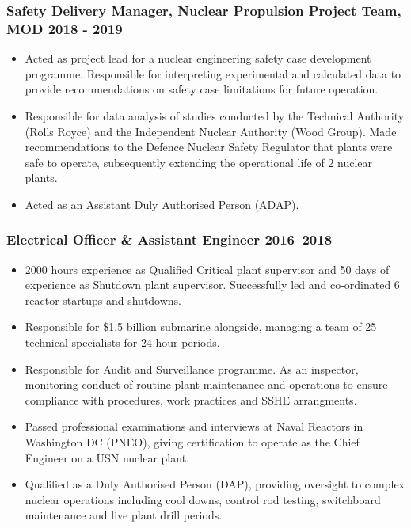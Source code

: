 \documentclass[a4paper, oneside, final, 11pt]{scrartcl} %
\begin{document}
\subsubsection*{Safety Delivery Manager,  Nuclear Propulsion Project Team, MOD \hfill 2018 - 2019}  
\normalfont
\begin{itemize}

\item Acted as project lead for a nuclear engineering safety case development programme.  Responsible for interpreting experimental and calculated data to provide recommendations on safety case limitations for future operation.

\item Responsible for data analysis of studies conducted by the Technical Authority (Rolls Royce) and the Independent Nuclear Authority (Wood Group). Made recommendations to the Defence Nuclear Safety Regulator that plants were safe to operate,  subsequently extending the operational life of 2 nuclear plants.

\item Acted as an Assistant Duly Authorised Person (ADAP). 

\end{itemize}

\smallskip 
				
\subsubsection*{Electrical Officer \& Assistant Engineer \hfill 2016--2018}  
\normalfont
\begin{itemize}

	 
	\item 2000 hours experience as Qualified Critical plant supervisor and 50 days of experience as Shutdown plant supervisor. Successfully led and co-ordinated 6 reactor startups and shutdowns.
	
\item  Responsible for \$1.5 billion submarine alongside, managing a team of 25 technical specialists for 24-hour periods. 
\item Responsible for Audit and Surveillance programme. As an inspector, monitoring conduct of routine plant maintenance and operations to ensure compliance with procedures, work practices and SSHE arrangments. 

\item Passed professional examinations and interviews at Naval Reactors in Washington DC (PNEO), giving certification to operate as the Chief Engineer on a USN nuclear plant. 

\item Qualified as a Duly Authorised Person (DAP), providing oversight to complex nuclear operations including cool downs, control rod testing, switchboard maintenance and live plant drill periods.
\end{itemize}
\end{document}
